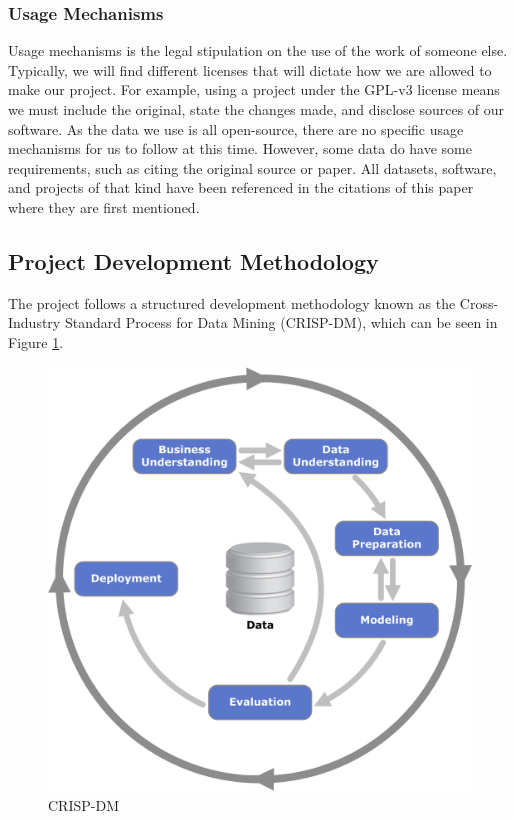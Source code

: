 \documentclass[stu,12pt,floatsintext]{apa7}
\begin{document}
\subsubsection{Usage Mechanisms}
Usage mechanisms is the legal stipulation on the use of the work of someone else. Typically, we will find different licenses that will dictate how we are allowed to make our project. For example, using a project under the GPL-v3 license means we must include the original, state the changes made, and disclose sources of our software. As the data we use is all open-source, there are no specific usage mechanisms for us to follow at this time. However, some data do have some requirements, such as citing the original source or paper. All datasets, software, and projects of that kind have been referenced in the citations of this paper where they are first mentioned.


\subsection{Project Development Methodology}
The project follows a structured development methodology known as the Cross-Industry Standard Process for Data Mining (CRISP-DM), which can be seen in Figure \ref{fig:crispdm}.

\begin{figure}[!htb]
	\centering
	\includegraphics[width=0.5\linewidth]{./images/CRISP-DM.png}
	\caption{CRISP-DM}
	\label{fig:crispdm}
\end{figure}
\end{document}
